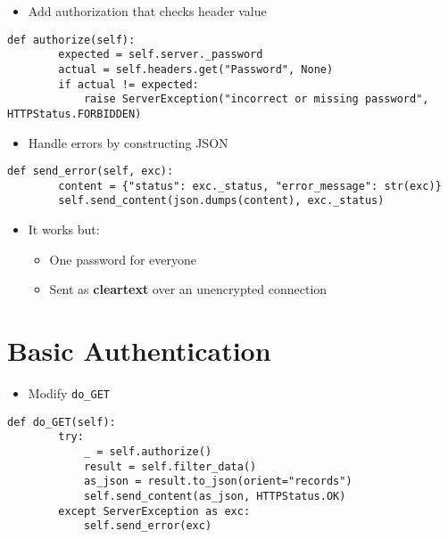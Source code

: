 \documentclass[krantzl]{krantz}
\newcommand{\glossref}[1]{\textbf{#1}}
\begin{document}
\begin{itemize}
\item Add authorization that checks header value

\end{itemize}
\begin{lstlisting}[frame=tblr]
    def authorize(self):
        expected = self.server._password
        actual = self.headers.get("Password", None)
        if actual != expected:
            raise ServerException("incorrect or missing password", HTTPStatus.FORBIDDEN)
\end{lstlisting}

\begin{itemize}
\item Handle errors by constructing JSON

\end{itemize}
\begin{lstlisting}[frame=tblr]
    def send_error(self, exc):
        content = {"status": exc._status, "error_message": str(exc)}
        self.send_content(json.dumps(content), exc._status)
\end{lstlisting}

\begin{itemize}
\item It works but:\begin{itemize}
\item One password for everyone

\item Sent as \glossref{cleartext} over an unencrypted connection

\end{itemize}


\end{itemize}
\section{Basic Authentication}
\begin{itemize}
\item Modify \texttt{do\_GET}

\end{itemize}
\begin{lstlisting}[frame=tblr]
    def do_GET(self):
        try:
            _ = self.authorize()
            result = self.filter_data()
            as_json = result.to_json(orient="records")
            self.send_content(as_json, HTTPStatus.OK)
        except ServerException as exc:
            self.send_error(exc)
\end{lstlisting}
\end{document}
